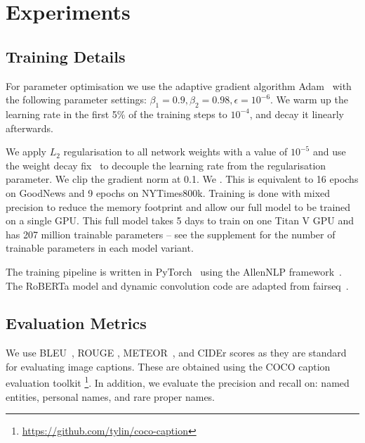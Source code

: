 
\section{Experiments}

\subsection{Training Details}

For parameter optimisation we use the adaptive gradient algorithm
Adam~\cite{Kingma2015Adam} with the following
parameter settings: $\beta_1 = 0.9, \beta_2 = 0.98, \epsilon = 10^{-6}$. We
warm up the
learning rate in the first 5\% of the training steps to $10^{-4}$, and decay
it linearly afterwards.

We apply $L_2$ regularisation to all network weights with a value of $10^{-5}$
and use the weight decay fix~\cite{Loshchilov2018DecoupledWD} to decouple the
learning rate from the regularisation parameter. We clip the gradient norm at
0.1. We . This is equivalent to 16
epochs on GoodNews and 9 epochs on NYTimes800k. Training is done with mixed
precision to reduce the
memory footprint and allow our full model to be trained on a single GPU. This
full model
takes 5 days to train on one Titan V GPU and
has 207 million trainable parameters -- see the supplement for the number of
trainable parameters in each model variant.

The training pipeline is written in PyTorch~\cite{Paszke2017Automatic} using
the AllenNLP framework~\cite{Gardner2017AllenNLP}. The RoBERTa model and
dynamic convolution code are adapted from fairseq~\cite{Ott2019Fairseq}.

\subsection{Evaluation Metrics}

We use BLEU~\cite{Papineni2002Bleu}, ROUGE
\cite{Lin2004ROUGE}, METEOR~\cite{Denkowski2014Meteor}, and CIDEr
\cite{Vedantam2015CIDEr} scores as they are standard for evaluating image
captions. These are obtained using the COCO
caption evaluation toolkit
\footnote{\href{https://github.com/tylin/coco-caption}
{https://github.com/tylin/coco-caption}}. In addition, we evaluate the
precision and recall on: named entities, personal names, and rare proper names.

